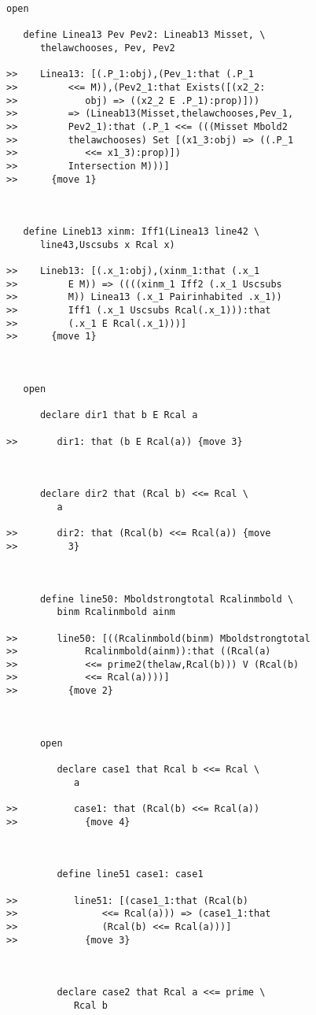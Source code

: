 \documentclass[12pt]{article}
\begin{document}
\begin{verbatim}
open

   define Linea13 Pev Pev2: Lineab13 Misset, \
      thelawchooses, Pev, Pev2

>>    Linea13: [(.P_1:obj),(Pev_1:that (.P_1
>>         <<= M)),(Pev2_1:that Exists([(x2_2:
>>            obj) => ((x2_2 E .P_1):prop)]))
>>         => (Lineab13(Misset,thelawchooses,Pev_1,
>>         Pev2_1):that (.P_1 <<= (((Misset Mbold2
>>         thelawchooses) Set [(x1_3:obj) => ((.P_1
>>            <<= x1_3):prop)])
>>         Intersection M)))]
>>      {move 1}



   define Lineb13 xinm: Iff1(Linea13 line42 \
      line43,Uscsubs x Rcal x)

>>    Lineb13: [(.x_1:obj),(xinm_1:that (.x_1
>>         E M)) => ((((xinm_1 Iff2 (.x_1 Uscsubs
>>         M)) Linea13 (.x_1 Pairinhabited .x_1))
>>         Iff1 (.x_1 Uscsubs Rcal(.x_1))):that
>>         (.x_1 E Rcal(.x_1)))]
>>      {move 1}



   open

      declare dir1 that b E Rcal a

>>       dir1: that (b E Rcal(a)) {move 3}



      declare dir2 that (Rcal b) <<= Rcal \
         a

>>       dir2: that (Rcal(b) <<= Rcal(a)) {move
>>         3}



      define line50: Mboldstrongtotal Rcalinmbold \
         binm Rcalinmbold ainm

>>       line50: [((Rcalinmbold(binm) Mboldstrongtotal
>>            Rcalinmbold(ainm)):that ((Rcal(a)
>>            <<= prime2(thelaw,Rcal(b))) V (Rcal(b)
>>            <<= Rcal(a))))]
>>         {move 2}



      open

         declare case1 that Rcal b <<= Rcal \
            a

>>          case1: that (Rcal(b) <<= Rcal(a))
>>            {move 4}



         define line51 case1: case1

>>          line51: [(case1_1:that (Rcal(b)
>>               <<= Rcal(a))) => (case1_1:that
>>               (Rcal(b) <<= Rcal(a)))]
>>            {move 3}



         declare case2 that Rcal a <<= prime \
            Rcal b


\end{verbatim}
\end{document}
